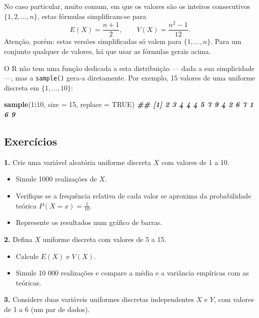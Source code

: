 \documentclass[
  portuguese,
  11pt,
  openany]{book}
\newenvironment{Shaded}{\begin{snugshade}}{\end{snugshade}}
\newcommand{\AttributeTok}[1]{\textcolor[rgb]{0.13,0.29,0.53}{#1}}
\newcommand{\ConstantTok}[1]{\textcolor[rgb]{0.56,0.35,0.01}{#1}}
\newcommand{\DecValTok}[1]{\textcolor[rgb]{0.00,0.00,0.81}{#1}}
\newcommand{\DocumentationTok}[1]{\textcolor[rgb]{0.56,0.35,0.01}{\textbf{\textit{#1}}}}
\newcommand{\FunctionTok}[1]{\textcolor[rgb]{0.13,0.29,0.53}{\textbf{#1}}}
\newcommand{\NormalTok}[1]{#1}
\newcommand{\SpecialCharTok}[1]{\textcolor[rgb]{0.81,0.36,0.00}{\textbf{#1}}}
\providecommand{\tightlist}{%
  \setlength{\itemsep}{0pt}\setlength{\parskip}{0pt}}
\begin{document}
No caso particular, muito comum, em que os valores são os inteiros consecutivos
\(\{1, 2, \ldots, n\}\), estas fórmulas simplificam-se para
\[E(X) = \frac{n+1}{2}, \qquad V(X) = \frac{n^2 - 1}{12}.\]
Atenção, porém: estas versões simplificadas só valem para \(\{1, \ldots, n\}\). Para um
conjunto qualquer de valores, há que usar as fórmulas gerais acima.

O R não tem uma função dedicada a esta distribuição --- dada a sua simplicidade ---, mas a
\texttt{sample()} gera-a diretamente. Por exemplo, 15 valores de uma uniforme discreta em
\(\{1, \ldots, 10\}\):

\begin{Shaded}
\begin{Highlighting}[]
\FunctionTok{sample}\NormalTok{(}\DecValTok{1}\SpecialCharTok{:}\DecValTok{10}\NormalTok{, }\AttributeTok{size =} \DecValTok{15}\NormalTok{, }\AttributeTok{replace =} \ConstantTok{TRUE}\NormalTok{)}
\DocumentationTok{\#\# [1] 2 3 4 4 4 5 7 9 4 2 6 7 1 6 9}
\end{Highlighting}
\end{Shaded}

\subsection{Exercícios}\label{exercuxedcios-25}

\textbf{1.} Crie uma variável aleatória uniforme discreta \(X\) com valores de 1 a 10.

\begin{itemize}
\tightlist
\item
  Simule 1000 realizações de \(X\).
\item
  Verifique se a frequência relativa de cada valor se aproxima da probabilidade teórica
  \(P(X = x) = \frac{1}{10}\).
\item
  Represente os resultados num gráfico de barras.
\end{itemize}

\textbf{2.} Defina \(X\) uniforme discreta com valores de 5 a 15.

\begin{itemize}
\tightlist
\item
  Calcule \(E(X)\) e \(V(X)\).
\item
  Simule 10 000 realizações e compare a média e a variância empíricas com as teóricas.
\end{itemize}

\textbf{3.} Considere duas variáveis uniformes discretas independentes \(X\) e \(Y\), com valores
de 1 a 6 (um par de dados).
\end{document}
